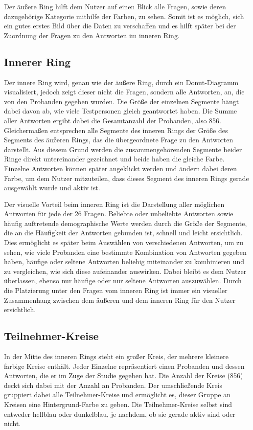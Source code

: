 \documentclass{mi-seminar}
\begin{document}
Der äußere Ring hilft dem Nutzer auf einen Blick alle Fragen, sowie deren dazugehörige Kategorie mithilfe der Farben, zu sehen. Somit ist es möglich, sich ein gutes erstes Bild über die Daten zu verschaffen und es hilft später bei der Zuordnung der Fragen zu den Antworten im inneren Ring. 

\subsection{Innerer Ring}
Der innere Ring wird, genau wie der äußere Ring, durch ein Donut-Diagramm visualisiert, jedoch zeigt dieser nicht die Fragen, sondern alle Antworten, an, die von den Probanden gegeben wurden. Die Größe der einzelnen Segmente hängt dabei davon ab, wie viele Testpersonen gleich geantwortet haben. Die Summe aller Antworten ergibt dabei die Gesamtanzahl der Probanden, also 856. Gleichermaßen entsprechen alle Segmente des inneren Rings der Größe des Segments des äußeren Rings, das die übergeordnete Frage zu den Antworten darstellt. Aus diesem Grund werden die zusammengehörenden Segmente beider Ringe direkt untereinander gezeichnet und beide haben die gleiche Farbe. Einzelne Antworten können später angeklickt werden und ändern dabei deren Farbe, um dem Nutzer mitzuteilen, dass dieses Segment des inneren Rings gerade ausgewählt wurde und aktiv ist. 

Der visuelle Vorteil beim inneren Ring ist die Darstellung aller möglichen Antworten für jede der 26 Fragen. Beliebte oder unbeliebte Antworten sowie häufig auftretende demographische Werte werden durch die Größe der Segmente, die an die Häufigkeit der Antworten gebunden ist, schnell und leicht ersichtlich. Dies ermöglicht es später beim Auswählen von verschiedenen Antworten, um zu sehen, wie viele Probanden eine bestimmte Kombination von Antworten gegeben haben, häufige oder seltene Antworten beliebig miteinander zu kombinieren und zu vergleichen, wie sich diese aufeinander auswirken. Dabei bleibt es dem Nutzer überlassen, ebenso nur häufige oder nur seltene Antworten auszuwählen. Durch die Platzierung unter den Fragen vom inneren Ring ist immer ein visueller Zusammenhang zwischen dem äußeren und dem inneren Ring für den Nutzer ersichtlich.

\subsection{Teilnehmer-Kreise}
In der Mitte des inneren Rings steht ein großer Kreis, der mehrere kleinere farbige Kreise enthält. Jeder Einzelne repräsentiert einen Probanden und dessen Antworten, die er im Zuge der Studie gegeben hat. Die Anzahl der Kreise (856) deckt sich dabei mit der Anzahl an Probanden. Der umschließende Kreis gruppiert dabei alle Teilnehmer-Kreise und ermöglicht es, dieser Gruppe an Kreisen eine Hintergrund-Farbe zu geben. Die Teilnehmer-Kreise selbst sind entweder hellblau oder dunkelblau, je nachdem, ob sie gerade aktiv sind oder nicht.
\end{document}

